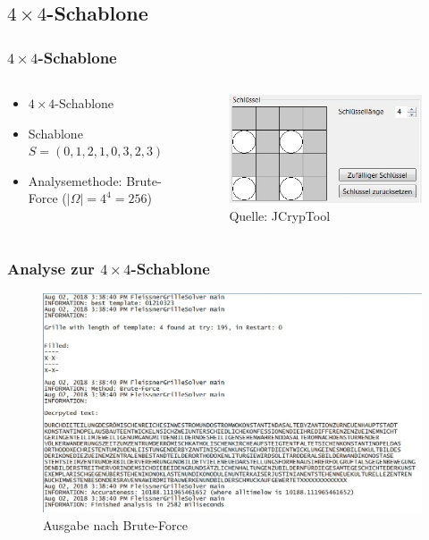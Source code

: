 \documentclass{beamer}
\begin{document}
\subsection{\texorpdfstring{$4 \times 4$-Schablone}{4 × 4-Schablone}}
\begin{frame}
\frametitle{$4 \times 4$-Schablone}
\begin{columns}
\begin{column}{4cm}
\vspace{1cm}
\begin{itemize}
\item $4 \times 4$-Schablone
\item Schablone $S=(0,1,2,1,0,3,2,3)$
\item Analysemethode: Brute-Force ($|\Omega|=4^4= 256$)
\end{itemize}
\vspace{3cm} 
\end{column}
\hspace{1cm}
\begin{column}{5cm}
\begin{figure}
\includegraphics[scale=0.6]{Schablone4mal4.jpg}
\caption{Quelle: JCrypTool}
\end{figure}
\vspace{1cm}
\end{column}
\end{columns}
\end{frame}



\begin{frame}
\frametitle{Analyse zur $4 \times 4$-Schablone}
\begin{figure}
\includegraphics[scale=0.45]{Ausgabe4Mal4.jpg} 
\caption{Ausgabe nach Brute-Force}
\end{figure}
\end{frame}
\end{document}
